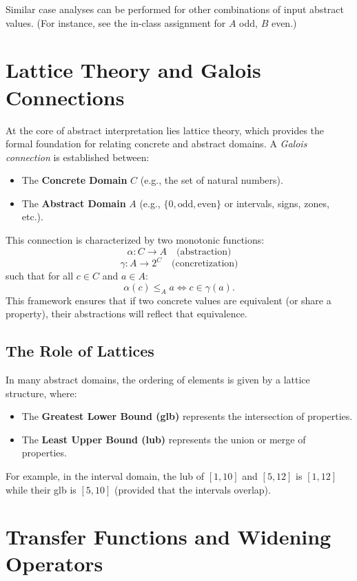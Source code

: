 \documentclass[oneside,11pt,dvipsnames]{book}
\begin{document}
Similar case analyses can be performed for other combinations of input abstract values. (For instance, see the in-class assignment for \(A\) odd, \(B\) even.)

\section{Lattice Theory and Galois Connections}

At the core of abstract interpretation lies lattice theory, which provides the formal foundation for relating concrete and abstract domains. A \emph{Galois connection} is established between:

\begin{itemize}
    \item The \textbf{Concrete Domain} \(C\) (e.g., the set of natural numbers).
    \item The \textbf{Abstract Domain} \(A\) (e.g., \(\{0, \text{odd}, \text{even}\}\) or intervals, signs, zones, etc.).
\end{itemize}

This connection is characterized by two monotonic functions:
\[
\alpha : C \to A \quad \text{(abstraction)}
\]
\[
\gamma : A \to 2^C \quad \text{(concretization)}
\]
such that for all \(c \in C\) and \(a \in A\):
\[
\alpha(c) \leq_A a \iff c \in \gamma(a).
\]
This framework ensures that if two concrete values are equivalent (or share a property), their abstractions will reflect that equivalence.

\subsection{The Role of Lattices}

In many abstract domains, the ordering of elements is given by a lattice structure, where:
\begin{itemize}
    \item The \textbf{Greatest Lower Bound (glb)} represents the intersection of properties.
    \item The \textbf{Least Upper Bound (lub)} represents the union or merge of properties.
\end{itemize}
For example, in the interval domain, the lub of \([1, 10]\) and \([5, 12]\) is \([1,12]\) while their glb is \([5,10]\) (provided that the intervals overlap).

\section{Transfer Functions and Widening Operators}
\end{document}
